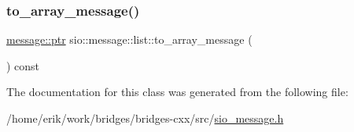 \mbox{\label{classsio_1_1message_1_1list_a2caed73564783959930188349ce0620e}} 
\subsubsection{\texorpdfstring{to\+\_\+array\+\_\+message()}{to\_array\_message()}\hspace{0.1cm}{\footnotesize\ttfamily [2/2]}}
{\footnotesize\ttfamily \hyperlink{classsio_1_1message_a6340b6fef57e4516eb17928b1885a615}{message\+::ptr} sio\+::message\+::list\+::to\+\_\+array\+\_\+message (\begin{DoxyParamCaption}{ }\end{DoxyParamCaption}) const\hspace{0.3cm}{\ttfamily [inline]}}



The documentation for this class was generated from the following file\+:\begin{DoxyCompactItemize}
\item 
/home/erik/work/bridges/bridges-\/cxx/src/\hyperlink{sio__message_8h}{sio\+\_\+message.\+h}\end{DoxyCompactItemize}

